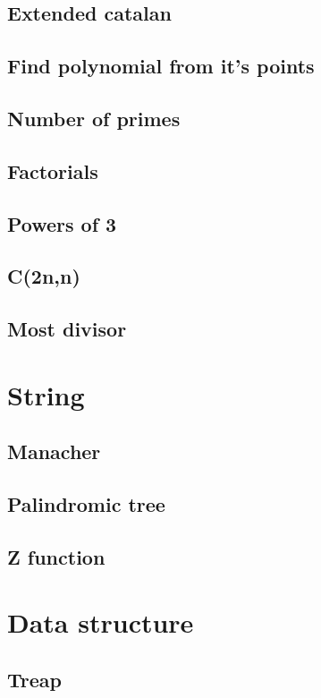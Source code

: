 \subsection{Extended catalan}

\hrulefill
\subsection{Find polynomial from it's points}

\hrulefill
\subsection{Number of primes}
\raggedbottom
\hrulefill
\subsection{Factorials}
\raggedbottom
\hrulefill
\subsection{Powers of 3}
\raggedbottom
\hrulefill
\subsection{C(2n,n)}
\raggedbottom
\hrulefill
\subsection{Most divisor}
\raggedbottom
\hrulefill

\section{String}
\subsection{Manacher}
\raggedbottom
\hrulefill
\subsection{Palindromic tree}
\raggedbottom
\hrulefill
\subsection{Z function}
\raggedbottom
\hrulefill

\section{Data structure}
\subsection{Treap}
\raggedbottom
\hrulefill


